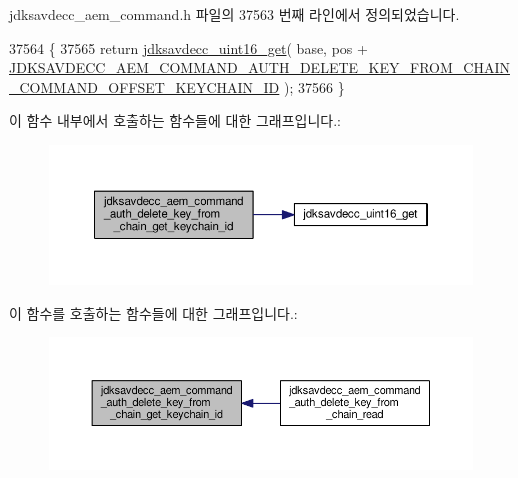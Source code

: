 jdksavdecc\+\_\+aem\+\_\+command.\+h 파일의 37563 번째 라인에서 정의되었습니다.


\begin{DoxyCode}
37564 \{
37565     \textcolor{keywordflow}{return} \hyperlink{group__endian_ga3fbbbc20be954aa61e039872965b0dc9}{jdksavdecc\_uint16\_get}( base, pos + 
      \hyperlink{group__command__auth__delete__key__from__chain_gac6246c3e92af99eb838bdc996829ada2}{JDKSAVDECC\_AEM\_COMMAND\_AUTH\_DELETE\_KEY\_FROM\_CHAIN\_COMMAND\_OFFSET\_KEYCHAIN\_ID}
       );
37566 \}
\end{DoxyCode}


이 함수 내부에서 호출하는 함수들에 대한 그래프입니다.\+:
\nopagebreak
\begin{figure}[H]
\begin{center}
\leavevmode
\includegraphics[width=350pt]{group__command__auth__delete__key__from__chain_ga2145326e6661b0c699a0af29109c0d31_cgraph}
\end{center}
\end{figure}




이 함수를 호출하는 함수들에 대한 그래프입니다.\+:
\nopagebreak
\begin{figure}[H]
\begin{center}
\leavevmode
\includegraphics[width=350pt]{group__command__auth__delete__key__from__chain_ga2145326e6661b0c699a0af29109c0d31_icgraph}
\end{center}
\end{figure}


